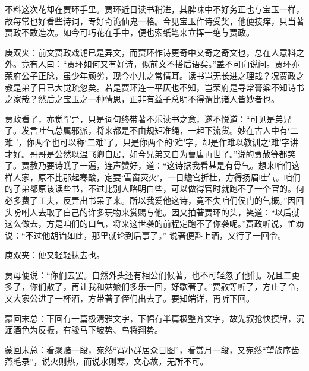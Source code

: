 \begin{parag}
    不料这次花却在贾环手里。贾环近日读书稍进，其脾味中不好务正也与宝玉一样，故每常也好看些诗词，专好奇诡仙鬼一格。今见宝玉作诗受奖，他便技痒，只当著贾政不敢造次。如今可巧花在手中，便也索纸笔来立挥一绝与贾政。\begin{note}庚双夹：前文贾政戏谑已是异文，而贾环作诗更奇中又奇之奇文也，总在人意料之外。竟有人曰：“贾环如何又有好诗，似前文不搭后语矣。”盖不可向说问。贾环亦荣府公子正脉，虽少年顽劣，现今小儿之常情耳。读书岂无长进之理哉？况贾政之教是弟子目已大觉疏忽矣。若是贾环连一平仄也不知，岂荣府是寻常膏粱不知诗书之家哉？然后之宝玉之一种情思，正非有益子总明不得谓比诸人皆妙者也。\end{note}贾政看了，亦觉罕异，只是词句终带著不乐读书之意，遂不悦道：“可见是弟兄了。发言吐气总属邪派，将来都是不由规矩准绳，一起下流货。妙在古人中有‘二难 ’，你两个也可以称‘二难’了。只是你两个的‘难’字，却是作难以教训之‘难’字讲才好。哥哥是公然以温飞卿自居，如今兄弟又自为曹唐再世了。”说的贾赦等都笑了。贾赦乃要诗瞧了一遍，连声赞好，道：“这诗据我看甚是有骨气。想来咱们这样人家，原不比那起寒酸，定要‘雪窗荧火’，一日蟾宫折桂，方得扬眉吐气。咱们的子弟都原该读些书，不过比别人略明白些，可以做得官时就跑不了一个官的。何必多费了工夫，反弄出书呆子来。所以我爱他这诗，竟不失咱们侯门的气概。”因回头吩咐人去取了自己的许多玩物来赏赐与他。因又拍著贾环的头，笑道：“以后就这么做去，方是咱们的口气，将来这世袭的前程定跑不了你袭呢。”贾政听说，忙劝说：“不过他胡诌如此，那里就论到后事了。” 说著便斟上酒，又行了一回令。\begin{note}庚双夹：便又轻轻抹去也。\end{note}贾母便说：“你们去罢。自然外头还有相公们候著，也不可轻忽了他们。况且二更多了，你们散了，再让我和姑娘们多乐一回，好歇著了。”贾赦等听了，方止了令，又大家公进了一杯酒，方带著子侄们出去了。要知端详，再听下回。
\end{parag}


\begin{parag}
    \begin{note}蒙回末总：下回有一篇极清雅文字，下幅有半篇极整齐文字，故先叙抢快摸牌，沉湎酒色为反振，有骏马下坡势、鸟将翔势。\end{note}
\end{parag}


\begin{parag}
    \begin{note}蒙回末总：看聚赌一段，宛然“宵小群居众日图”，看赏月一段，又宛然“望族序齿燕毛录”，说火则热，而说水则寒，文心故，无所不可。\end{note}
\end{parag}
